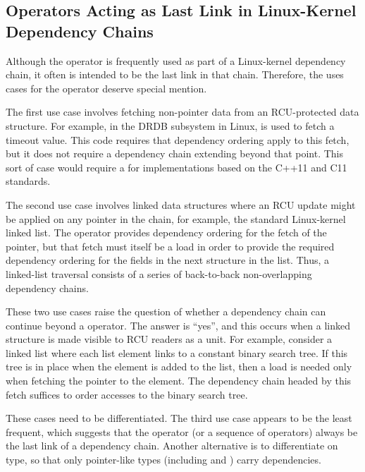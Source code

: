 \documentclass[letterpaper,twocolumn,10pt]{article}
\begin{document}
\subsection{Operators Acting as Last Link in Linux-Kernel Dependency Chains}
\label{sec:Operators Acting as Last Link in Linux-Kernel Dependency Chains}

Although the \co{->} operator is frequently used as part of a
Linux-kernel dependency chain, it often is intended to be the last link
in that chain.
Therefore, the uses cases for the \co{->} operator deserve special mention.

The first use case involves fetching non-pointer data from an RCU-protected
data structure.
For example, in the DRDB subsystem in Linux, \co{->} is used to fetch
a timeout value.
This code requires that dependency ordering apply to this fetch, but
it does not require a dependency chain extending beyond that point.
This sort of case would require a 
for implementations based on the C++11 and C11 standards.

The second use case involves linked data structures where an RCU update
might be applied on any pointer in the chain, for example, the standard
Linux-kernel linked list.
The \co{->} operator provides dependency ordering for the fetch of the
 pointer, but that fetch must itself be a 
load in order to provide the required dependency ordering for the fields
in the next structure in the list.
Thus, a linked-list traversal consists of a series of back-to-back
non-overlapping dependency chains.

These two use cases raise the question of whether a dependency chain
can continue beyond a \co{->} operator.
The answer is ``yes'', and this occurs when a linked structure is
made visible to RCU readers as a unit.
For example, consider a linked list where each list element links to
a constant binary search tree.
If this tree is in place when the element is added to the list, then
a  load is needed only when fetching the
pointer to the element.
The dependency chain headed by this fetch suffices to order accesses
to the binary search tree.

These cases need to be differentiated.
The third use case appears to be the least frequent, which suggests
that the \co{->} operator (or a sequence of \co{->} operators)
always be the last link of a dependency
chain.
Another alternative is to differentiate on type, so that only pointer-like
types (including  and ) carry dependencies.
\end{document}
